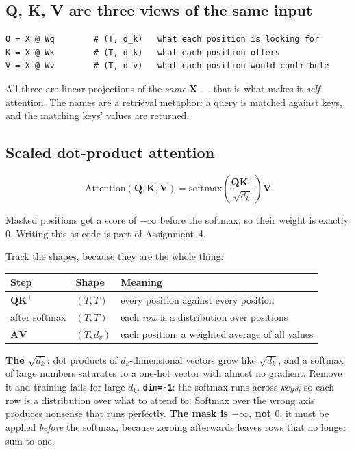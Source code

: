 \documentclass[11pt]{article}
\begin{document}
\subsection{Q, K, V are three views of the same input}

\begin{lstlisting}
Q = X @ Wq        # (T, d_k)   what each position is looking for
K = X @ Wk        # (T, d_k)   what each position offers
V = X @ Wv        # (T, d_v)   what each position would contribute
\end{lstlisting}

All three are linear projections of the \emph{same} $\boldsymbol{X}$ --- that is
what makes it \emph{self}-attention. The names are a retrieval metaphor: a query
is matched against keys, and the matching keys' values are returned.

\subsection{Scaled dot-product attention}

\[
\mathrm{Attention}(\boldsymbol{Q},\boldsymbol{K},\boldsymbol{V})
= \mathrm{softmax}\!\left(\frac{\boldsymbol{Q}\boldsymbol{K}^{\!\top}}{\sqrt{d_k}}\right)\boldsymbol{V}
\]

Masked positions get a score of $-\infty$ before the softmax, so their weight is exactly 0. Writing this as code is part of Assignment~4.

Track the shapes, because they are the whole thing:

\begin{center}
\begin{tabular}{@{}lll@{}}
\toprule
Step & Shape & Meaning \\
\midrule
$\boldsymbol{Q}\boldsymbol{K}^{\!\top}$ & $(T, T)$ & every position against every position \\
after softmax & $(T, T)$ & each \emph{row} is a distribution over positions \\
$\boldsymbol{A}\boldsymbol{V}$ & $(T, d_v)$ & each position: a weighted average of all values \\
\bottomrule
\end{tabular}
\end{center}

\begin{keybox}
\textbf{The $\sqrt{d_k}$}: dot products of $d_k$-dimensional vectors grow like
$\sqrt{d_k}$, and a softmax of large numbers saturates to a one-hot vector with
almost no gradient. Remove it and training fails for large $d_k$.
\textbf{\texttt{dim=-1}}: the softmax runs across \emph{keys}, so each row is a
distribution over what to attend to. Softmax over the wrong axis produces
nonsense that runs perfectly.
\textbf{The mask is $-\infty$, not $0$}: it must be applied \emph{before} the
softmax, because zeroing afterwards leaves rows that no longer sum to one.
\end{keybox}
\end{document}
